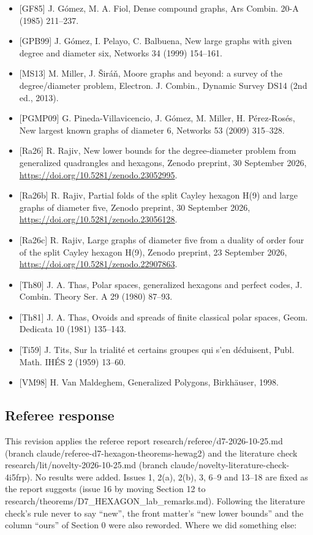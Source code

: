 \documentclass[
  11pt,
]{article}
\begin{document}
\begin{itemize}
  in the generalized hexagon H(4), Discrete Math. 308 (2008) 2976--2983.
\item
  {[}GF85{]} J. Gómez, M. A. Fiol, Dense compound graphs, Ars Combin. 20-A (1985) 211--237.
\item
  {[}GPB99{]} J. Gómez, I. Pelayo, C. Balbuena, New large graphs with given degree and diameter six, Networks 34 (1999)
  154--161.
\item
  {[}MS13{]} M. Miller, J. Širáň, Moore graphs and beyond: a survey of the degree/diameter problem, Electron. J.
  Combin., Dynamic Survey DS14 (2nd ed., 2013).
\item
  {[}PGMP09{]} G. Pineda-Villavicencio, J. Gómez, M. Miller, H. Pérez-Rosés, New largest known graphs of diameter 6,
  Networks 53 (2009) 315--328.
\item
  {[}Ra26{]} R. Rajiv, New lower bounds for the degree-diameter problem from generalized quadrangles and hexagons,
  Zenodo preprint, 30 September 2026, \url{https://doi.org/10.5281/zenodo.23052995}.
\item
  {[}Ra26b{]} R. Rajiv, Partial folds of the split Cayley hexagon H(9) and large graphs of diameter five, Zenodo
  preprint, 30 September 2026, \url{https://doi.org/10.5281/zenodo.23056128}.
\item
  {[}Ra26c{]} R. Rajiv, Large graphs of diameter five from a duality of order four of the split Cayley hexagon H(9),
  Zenodo preprint, 23 September 2026, \url{https://doi.org/10.5281/zenodo.22907863}.
\item
  {[}Th80{]} J. A. Thas, Polar spaces, generalized hexagons and perfect codes, J. Combin. Theory Ser. A 29 (1980)
  87--93.
\item
  {[}Th81{]} J. A. Thas, Ovoids and spreads of finite classical polar spaces, Geom. Dedicata 10 (1981) 135--143.
\item
  {[}Ti59{]} J. Tits, Sur la trialité et certains groupes qui s'en déduisent, Publ. Math. IHÉS 2 (1959) 13--60.
\item
  {[}VM98{]} H. Van Maldeghem, Generalized Polygons, Birkhäuser, 1998.
\end{itemize}

\hypertarget{referee-response}{%
\subsection{Referee response}\label{referee-response}}

This revision applies the referee report research/referee/d7-2026-10-25.md (branch
claude/referee-d7-hexagon-theorems-hewag2) and the literature check research/lit/novelty-2026-10-25.md (branch
claude/novelty-literature-check-4i5frp). No results were added. Issues 1, 2(a), 2(b), 3, 6--9 and 13--18 are fixed as
the report suggests (issue 16 by moving Section 12 to research/theorems/D7\_HEXAGON\_lab\_remarks.md). Following the
literature check's rule never to say ``new'', the front matter's ``new lower bounds'' and the column ``ours'' of Section
0 were also reworded. Where we did something else:
\end{document}
